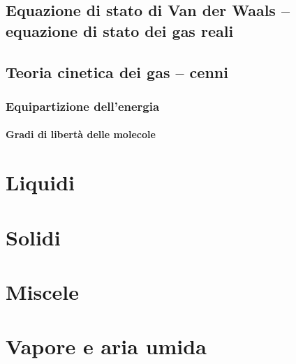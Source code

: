 \subsection{Equazione di stato di Van der Waals -- equazione di stato dei gas reali}

\subsection{Teoria cinetica dei gas -- cenni}

\subsubsection{Equipartizione dell'energia}

\paragraph{Gradi di libertà delle molecole}


\section{Liquidi}
\section{Solidi}
\section{Miscele}
\section{Vapore e aria umida}

